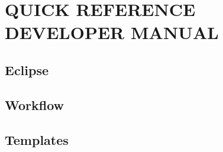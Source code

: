 \section{QUICK REFERENCE DEVELOPER MANUAL}

\subsection{Eclipse}

\subsection{Workflow}

\subsection{Templates}